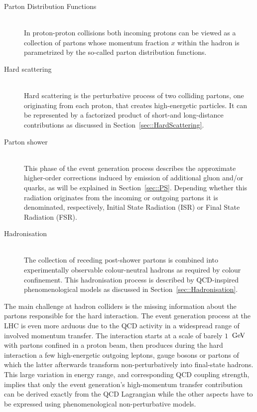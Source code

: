 \begin{myindentpar}
  \begin{description}
    \item[Parton Distribution Functions] \hfill \\
      In proton-proton collisions both incoming protons can be viewed as a collection of partons whose momentum fraction $x$ within the hadron is parametrized by the so-called parton distribution functions.
    \item[Hard scattering] \hfill \\
      Hard scattering is the perturbative process of two colliding partons, one originating from each proton, that creates high-energetic particles. It can be represented by a factorized product of short-and long-distance contributions as discussed in Section~\ref{sec::HardScattering}.
    \item[Parton shower] \hfill \\
      This phase of the event generation process describes the approximate higher-order corrections induced by emission of additional gluon and/or quarks, as will be explained in Section~\ref{sec::PS}. Depending whether this radiation originates from the incoming or outgoing partons it is denominated, respectively, Initial State Radiation (ISR) or Final State Radiation (FSR).
    \item[Hadronisation] \hfill \\
      The collection of receding post-shower partons is combined into experimentally observable colour-neutral hadrons as required by colour confinement. This hadronisation process is described by QCD-inspired phenomenological models as discussed in Section~\ref{sec::Hadronisation}.
  \end{description}
\end{myindentpar}

The main challenge at hadron colliders is the missing information about the partons responsible for the hard interaction. 
The event generation process at the LHC is even more arduous due to the QCD activity in a widespread range of involved momentum transfer. %
The interaction starts at a scale of barely $1$ $\, \mathrm{GeV}$ with partons confined in a proton beam, then produces during the hard interaction a few high-energetic outgoing leptons, gauge bosons or partons of which the latter afterwards transform non-perturbatively into final-state hadrons. This large variation in energy range, and corresponding QCD coupling strength, implies that only the event generation's high-momentum transfer contribution can be derived exactly from the QCD Lagrangian while the other aspects have to be expressed using phenomenological non-perturbative models.

